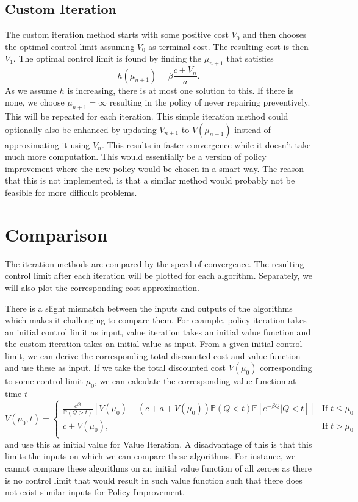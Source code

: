 \subsection{Custom Iteration}
The custom iteration method starts with some positive cost $V_0$ and then chooses the optimal control limit assuming $V_0$ as terminal cost.
The resulting cost is then $V_1$.
The optimal control limit is found by finding the $\mu_{n+1}$ that satisfies
$$
h(\mu_{n+1})= \beta\frac{c+V_n}{a}.
$$
As we assume $h$ is increasing, there is at most one solution to this. If there is none,  we choose $\mu_{n+1}=\infty$ resulting in the policy of never repairing preventively.
This will be repeated for each iteration.
This simple iteration method could optionally also be enhanced by updating $V_{n+1}$ to $V(\mu_{n+1})$ instead of approximating it using $V_n$.
This results in faster convergence while it doesn't take much more computation.
This would essentially be a version of policy improvement where the new policy would be chosen in a smart way.
The reason that this is not implemented, is that a similar method would probably not be feasible for more difficult problems.

\section{Comparison}
The iteration methods are compared by the speed of convergence.
The resulting control limit after each iteration will be plotted for each algorithm.
Separately, we will also plot the corresponding cost approximation.

There is a slight mismatch between the inputs and outputs of the algorithms which makes it challenging to compare them.
For example, policy iteration takes an initial control limit as input, value iteration takes an initial value function and the custom iteration takes an initial value as input.
From a given initial control limit, we can derive the corresponding total discounted cost and value function and use these as input.
If we take the total discounted cost $V(\mu_0)$ corresponding to some control limit $\mu_0$, we can calculate the corresponding value function at time $t$
\begin{equation}
V(\mu_0,t)=\begin{cases}
\frac{ e^{\beta t}}{\mathbb{P}(Q>t)} [V(\mu_0) - (c+a+V(\mu_0))\mathbb{P}(Q<t)\mathbb{E}[e^{-\beta Q}|Q<t]]&\text{If }t\leq \mu_0\\
c+V(\mu_0),& \text{If }t>\mu_0\\
\end{cases}
\end{equation}
and use this as initial value for Value Iteration.
A disadvantage of this is that this limits the inputs on which we can compare these algorithms.
For instance, we cannot compare these algorithms on an initial value function of all zeroes as there is no control limit that would result in such value function such that there does not exist similar inputs for Policy Improvement.

